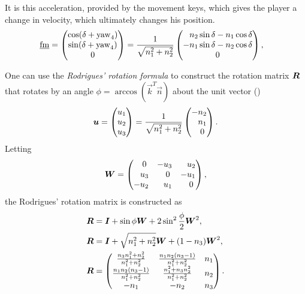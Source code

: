 It is this acceleration, provided by the movement keys, which gives the player a change in velocity, which ultimately changes his position.
\begin{align*}
\flat{\fmove} &=
\begin{pmatrix}
\cos(\delta+\yaw_4) \\ \sin(\delta+\yaw_4) \\ 0
\end{pmatrix} = \frac{1}{\sqrt{n_1^2 + n_2^2}}
\begin{pmatrix}
\hphantom{-}n_2\sin\delta - n_1\cos\delta\\
-n_1\sin\delta - n_2\cos\delta\\
0
\end{pmatrix},
\end{align*}

One can use the \emph{Rodrigues' rotation formula} to construct the rotation matrix $\boldsymbol{R}$ that rotates by an angle $\phi = \arccos(\vec{k}^T\vec{n})$ about the unit vector (\purplearrow)
\begin{equation}
\label{eq:u}
\vec{u} =
\begin{pmatrix}
u_1\\u_2\\u_3
\end{pmatrix} = \frac{1}{\sqrt{n_1^2 + n_2^2}}
\begin{pmatrix}
-n_2\\\hphantom{-}n_1\\\hphantom{-}0
\end{pmatrix}.
\end{equation}
Letting
\[
\boldsymbol{W} =
\begin{pmatrix}
\hphantom{-}0 & -u_3 & \hphantom{-}u_2\\
\hphantom{-}u_3 & \hphantom{-}0 & -u_1\\
-u_2 & \hphantom{-}u_1 & \hphantom{-}0
\end{pmatrix},
\]
the Rodrigues' rotation matrix is constructed as
\begin{align*}
\boldsymbol{R} &= \boldsymbol{I} + \sin \phi \boldsymbol{W} + 2\sin^2 \frac{\phi}{2}\boldsymbol{W}^2,\\
\boldsymbol{R} &= \boldsymbol{I} + \sqrt{n_1^2 + n_2^2}\boldsymbol{W} + (1 - n_3)\boldsymbol{W}^2,\\
\boldsymbol{R} &=
\begin{pmatrix}
\frac{n_3 n_1^2 + n_2^2}{n_1^2 + n_2^2} & \frac{n_1 n_2 (n_3 - 1)}{n_1^2 + n_2^2} & n_1\\
\frac{n_1 n_2 (n_3 - 1)}{n_1^2 + n_2^2} & \frac{n_1^2 + n_3 n_2^2}{n_1^2 + n_2^2} & n_2\\
-n_1 & -n_2 & n_3
\end{pmatrix}.
\end{align*}

